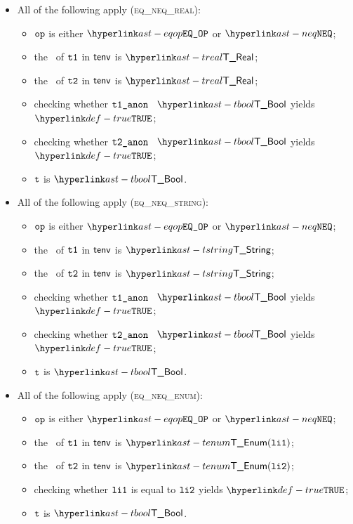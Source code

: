 \begin{itemize}
  \item All of the following apply (\textsc{eq\_neq\_real}):
  \begin{itemize}
    \item $\texttt{op}$ is either $\EQOP$ or $\NEQ$;
    \item the \underlyingtype\ of $\texttt{t1}$ in $\textsf{tenv}$ is $\TReal$\ProseOrTypeError;
    \item the \underlyingtype\ of $\texttt{t2}$ in $\textsf{tenv}$ is $\TReal$\ProseOrTypeError;
    \item checking whether $\texttt{t1\_anon}$ \typesatisfies\ $\TBool$ yields $\True$\ProseOrTypeError;
    \item checking whether $\texttt{t2\_anon}$ \typesatisfies\ $\TBool$ yields $\True$\ProseOrTypeError;
    \item $\texttt{t}$ is $\TBool$.
  \end{itemize}

  \item All of the following apply (\textsc{eq\_neq\_string}):
  \begin{itemize}
    \item $\texttt{op}$ is either $\EQOP$ or $\NEQ$;
    \item the \underlyingtype\ of $\texttt{t1}$ in $\textsf{tenv}$ is $\TString$\ProseOrTypeError;
    \item the \underlyingtype\ of $\texttt{t2}$ in $\textsf{tenv}$ is $\TString$\ProseOrTypeError;
    \item checking whether $\texttt{t1\_anon}$ \typesatisfies\ $\TBool$ yields $\True$\ProseOrTypeError;
    \item checking whether $\texttt{t2\_anon}$ \typesatisfies\ $\TBool$ yields $\True$\ProseOrTypeError;
    \item $\texttt{t}$ is $\TBool$.
  \end{itemize}

  \item All of the following apply (\textsc{eq\_neq\_enum}):
  \begin{itemize}
    \item $\texttt{op}$ is either $\EQOP$ or $\NEQ$;
    \item the \underlyingtype\ of $\texttt{t1}$ in $\textsf{tenv}$ is $\TEnum(\vlione)$\ProseOrTypeError;
    \item the \underlyingtype\ of $\texttt{t2}$ in $\textsf{tenv}$ is $\TEnum(\vlitwo)$\ProseOrTypeError;
    \item checking whether $\texttt{li1}$ is equal to $\texttt{li2}$ yields $\True$\ProseOrTypeError;
    \item $\texttt{t}$ is $\TBool$.
  \end{itemize}


\end{itemize}
